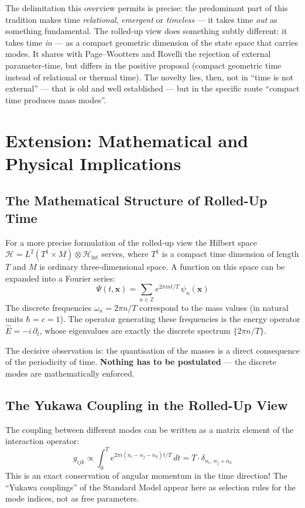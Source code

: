 The delimitation this overview permits is precise: the predominant part of this tradition makes time \emph{relational}, \emph{emergent} or \emph{timeless} --- it takes time \emph{out} as something fundamental. The rolled-up view does something subtly different: it takes time \emph{in} --- as a compact geometric dimension of the state space that carries modes. It shares with Page--Wootters and Rovelli the rejection of external parameter-time, but differs in the positive proposal (compact geometric time instead of relational or thermal time). The novelty lies, then, not in ``time is not external'' --- that is old and well established --- but in the specific route ``compact time produces mass modes''.

\section{Extension: Mathematical and Physical Implications}

\subsection{The Mathematical Structure of Rolled-Up Time}

For a more precise formulation of the rolled-up view the Hilbert space $\mathcal{H} = L^2(T^1 \times M) \otimes \mathcal{H}_{\text{int}}$ serves, where $T^1$ is a compact time dimension of length $T$ and $M$ is ordinary three-dimensional space. A function on this space can be expanded into a Fourier series:
\[
 \Psi(t, \mathbf{x}) = \sum_{n \in \mathbb{Z}} e^{2\pi i n t / T}\, \psi_n(\mathbf{x})
\]
The discrete frequencies $\omega_n = 2\pi n / T$ correspond to the mass values (in natural units $\hbar = c = 1$). The operator generating these frequencies is the energy operator $\hat{E} = -i\,\partial_t$, whose eigenvalues are exactly the discrete spectrum $\{2\pi n / T\}$.

The decisive observation is: the quantisation of the masses is a direct consequence of the periodicity of time. \textbf{Nothing has to be postulated} --- the discrete modes are mathematically enforced.

\subsection{The Yukawa Coupling in the Rolled-Up View}

The coupling between different modes can be written as a matrix element of the interaction operator:
\[
 g_{ijk} \propto \int_0^T e^{2\pi i(n_i - n_j - n_k)t/T}\, dt = T \cdot \delta_{n_i,\, n_j + n_k}
\]
This is an exact conservation of angular momentum in the time direction! The ``Yukawa couplings'' of the Standard Model appear here as selection rules for the mode indices, not as free parameters.

